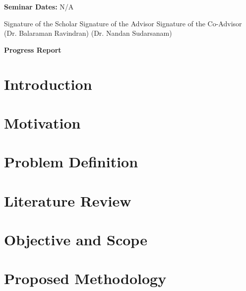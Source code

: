\documentclass[12pt]{article}
\begin{document}
\textbf{Seminar Dates:} N/A


\vspace{2.5cm}
\begin{center}
Signature of the Scholar \hfill Signature of the Advisor \hfill Signature of the Co-Advisor \\
\hfill \hfill (Dr. Balaraman Ravindran) \hfill (Dr. Nandan Sudarsanam)\\ \vspace{2cm}

\end{center}

\newpage
\begin{center}
\large \textbf{Progress Report}
\end{center}

\section{Introduction}
\label{intro}


\section{Motivation}
\label{motivation}


\section{Problem Definition}
\label{probDef}


\section{Literature Review}
\label{review}


\section{Objective and Scope}
\label{objective}


\section{Proposed Methodology}
\label{methodology}

\end{document}
